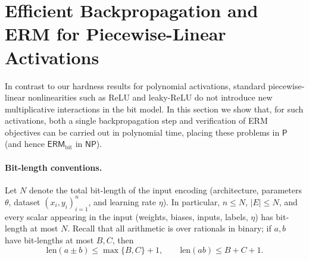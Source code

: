 \documentclass{article}
\theoremstyle{plain}
\theoremstyle{definition}
\theoremstyle{remark}
\begin{document}
\section{Efficient Backpropagation and ERM for Piecewise-Linear Activations}
\label{sec:efficient}

In contrast to our hardness results for polynomial activations, standard
piecewise-linear nonlinearities such as ReLU and leaky-ReLU do not introduce
new multiplicative interactions in the bit model.  In this section we show
that, for such activations, both a single backpropagation step and
verification of ERM objectives can be carried out in polynomial time, placing
these problems in $\mathsf{P}$ (and hence $\mathsf{ERM}_{\text{bit}}$ in $\mathsf{NP}$).





\paragraph{Bit-length conventions.}
Let $N$ denote the total bit-length of the input encoding (architecture,
parameters $\theta$, dataset $(x_i,y_i)_{i=1}^n$, and learning rate $\eta$).
In particular, $n \le N$, $|E| \le N$, and every scalar appearing in the input
(weights, biases, inputs, labels, $\eta$) has bit-length at most $N$.
Recall that all arithmetic is over rationals in binary; if $a,b$ have bit-lengths at most
$B,C$, then
\[
\mathrm{len}(a\pm b) \le \max\{B,C\}+1,
\qquad
\mathrm{len}(ab) \le B+C+1.
\]
\end{document}
